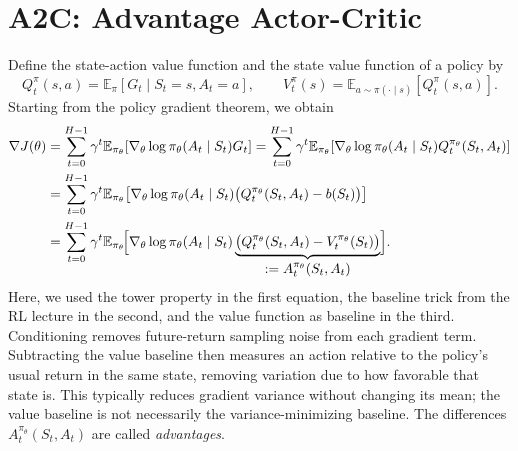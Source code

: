 \documentclass[11pt,a4paper]{article}
\newcommand{\E}{\mathbb{E}}
\begin{document}
\section{A2C: Advantage Actor-Critic}
Define the state-action value function and the state value function of a policy by
\begin{equation}
 Q^\pi_t(s,a)=\E_\pi[G_t\mid S_t=s,A_t=a],\qquad
 V^\pi_t(s)=\E_{a\sim\pi(\cdot\mid s)}[Q^\pi_t(s,a)].
\end{equation}
Starting from the policy gradient theorem, we obtain
\begin{align*}
 \nabla J(\theta)
 &=\sum_{t=0}^{H-1}\gamma^t\E_{\pi_\theta}\!\left[
 \nabla_\theta\log\pi_\theta(A_t\mid S_t)G_t\right]
 =\sum_{t=0}^{H-1}\gamma^t\E_{\pi_\theta}\!\left[
 \nabla_\theta\log\pi_\theta(A_t\mid S_t)Q^{\pi_\theta}_t(S_t,A_t)\right]\\
 &=\sum_{t=0}^{H-1}\gamma^t\E_{\pi_\theta}\!\left[
 \nabla_\theta\log\pi_\theta(A_t\mid S_t)
 \bigl(Q^{\pi_\theta}_t(S_t,A_t)-b(S_t)\bigr)\right]\\
 &=
 \sum_{t=0}^{H-1}\gamma^t\E_{\pi_\theta}\!\Bigl[
 \nabla_\theta\log\pi_\theta(A_t\mid S_t)
 \underbrace{\bigl(Q^{\pi_\theta}_t(S_t,A_t)-V^{\pi_\theta}_t(S_t)\bigr)}_
 {\displaystyle :=A^{\pi_\theta}_t(S_t,A_t)}\Bigr].
\end{align*}
Here, we used the tower property in the first equation, the baseline trick from the
RL lecture in the second, and the value function as baseline in the third.
Conditioning removes future-return sampling noise from each gradient term.
Subtracting the value baseline then measures an action relative to the policy's
usual return in the same state, removing variation due to how favorable that
state is. This typically reduces gradient variance without changing its mean;
the value baseline is not necessarily the variance-minimizing baseline. The
differences $A^{\pi_\theta}_t(S_t,A_t)$ are called \emph{advantages}.
\end{document}
